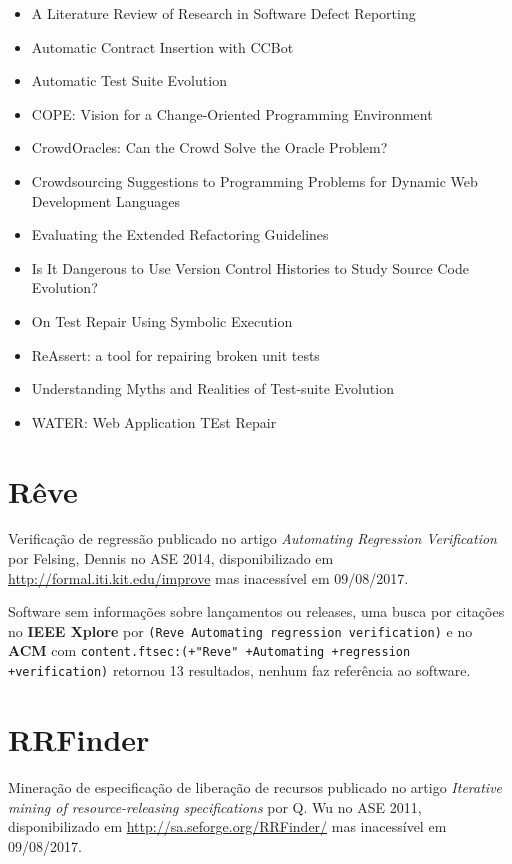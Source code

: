 \begin{itemize}
\item A Literature Review of Research in Software Defect Reporting
\item Automatic Contract Insertion with CCBot
\item Automatic Test Suite Evolution
\item COPE: Vision for a Change-Oriented Programming Environment
\item CrowdOracles: Can the Crowd Solve the Oracle Problem?
\item Crowdsourcing Suggestions to Programming Problems for Dynamic Web Development Languages
\item Evaluating the Extended Refactoring Guidelines
\item Is It Dangerous to Use Version Control Histories to Study Source Code Evolution?
\item On Test Repair Using Symbolic Execution
\item ReAssert: a tool for repairing broken unit tests
\item Understanding Myths and Realities of Test-suite Evolution
\item WATER: Web Application TEst Repair
\end{itemize}

\section{Rêve}

Verificação de regressão
publicado no artigo {\it Automating Regression Verification}
por Felsing, Dennis
no ASE 2014,
disponibilizado em \url{http://formal.iti.kit.edu/improve}
mas inacessível em 09/08/2017.

Software sem informações sobre lançamentos ou releases,
uma busca por citações no {\bf IEEE Xplore} por
\texttt{(Reve Automating regression verification)}
e no {\bf ACM} com
\texttt{content.ftsec:(+"Reve" +Automating +regression +verification)}
retornou
13 resultados,
nenhum faz referência ao software.


\section{RRFinder}

Mineração de especificação de liberação de recursos
publicado no artigo {\it Iterative mining of resource-releasing specifications}
por Q. Wu
no ASE 2011,
disponibilizado em \url{http://sa.seforge.org/RRFinder/}
mas inacessível em 09/08/2017.


